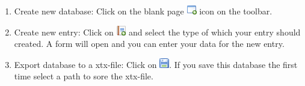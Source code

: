 \begin{enumerate}
 \item Create new database: Click on the blank page
   \includegraphics{./images/application_add.png} icon on the toolbar.
 \item Create new entry: Click on \includegraphics{./images/report_add.png}
   and select the type of which your entry should created. A form will open and
   you can enter your data for the new entry.
 \item Export database to a xtx-file: Click on
   \includegraphics{./images/disk.png}. If you save this database the first
   time select a path to sore the xtx-file.
\end{enumerate}
